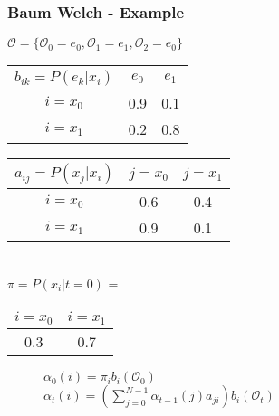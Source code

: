 \begin{frame}
	\frametitle{Baum Welch - Example}
  \begin{table}
  \centering
  $\mathcal{O} = \{\mathcal{O}_0 = e_0, \mathcal{O}_1 = e_1, \mathcal{O}_2 = e_0\}$\\
  \begin{tabular}{| c | c | c |}
  	\hline
    $b_{ik} = P(e_k|x_i)$ & $e_0$ & $e_1$ \\ \hline
    $i = x_0$                 & 0.9   & 0.1   \\ \hline
    $i = x_1$                 & 0.2   & 0.8   \\ \hline
  \end{tabular}
  \begin{tabular}{| c | c | c |}
  	\hline
    $a_{ij} = P(x_j|x_i)$ & $j = x_0$ & $j = x_1$ \\ \hline
    $i = x_0$                 & 0.6   & 0.4   \\ \hline
    $i = x_1$                 & 0.9   & 0.1   \\ \hline
  \end{tabular}
  \\$\pi = P(x_i|t=0)$ =
  \begin{tabular}{| c | c |}
  	\hline
    $i = x_0$ & $i = x_1$ \\ \hline
    0.3   & 0.7   \\ \hline
  \end{tabular}
  \begin{subfigure}{5.4cm}
  \centering
  \begin{framed}
  $\alpha_0(i) = \pi_i b_i(\mathcal{O}_0)$\\
  $\alpha_t(i) = \left(\sum\limits_{j=0}^{N-1} \alpha_{t-1}(j)a_{ji}\right)b_i(\mathcal{O}_t)$
  \end{framed}  
  \end{subfigure}
\end{table}
\end{frame}

